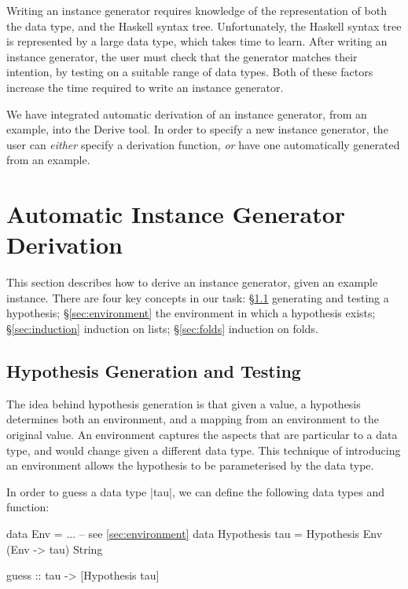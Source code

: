 \documentclass{llncs}
\begin{document}
Writing an instance generator requires knowledge of the representation of both the data type, and the Haskell syntax tree. Unfortunately, the Haskell syntax tree is represented by a large data type, which takes time to learn. After writing an instance generator, the user must check that the generator matches their intention, by testing on a suitable range of data types. Both of these factors increase the time required to write an instance generator.

We have integrated automatic derivation of an instance generator, from an example, into the Derive tool. In order to specify a new instance generator, the user can \textit{either} specify a derivation function, \textit{or} have one automatically generated from an example.


\section{Automatic Instance Generator Derivation}
\label{sec:automatic_instances}

This section describes how to derive an instance generator, given an example instance. There are four key concepts in our task: \S\ref{sec:generation} generating and testing a hypothesis; \S\ref{sec:environment} the environment in which a hypothesis exists; \S\ref{sec:induction} induction on lists; \S\ref{sec:folds} induction on folds.

\subsection{Hypothesis Generation and Testing}
\label{sec:generation}

The idea behind hypothesis generation is that given a value, a hypothesis determines both an environment, and a mapping from an environment to the original value. An environment captures the aspects that are particular to a data type, and would change given a different data type. This technique of introducing an environment allows the hypothesis to be parameterised by the data type.

In order to guess a data type |tau|, we can define the following data types and function:

\begin{code}
data Env = ... -- see \ref{sec:environment}
data Hypothesis tau = Hypothesis Env (Env -> tau) String

guess :: tau -> [Hypothesis tau]
\end{code}
\end{document}
